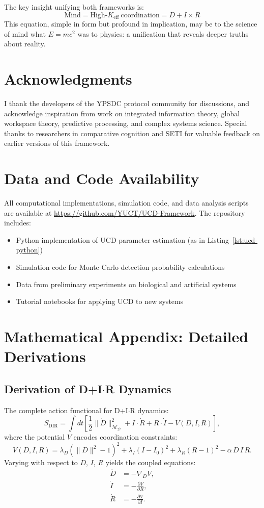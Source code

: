 \documentclass[12pt,a4paper]{article}
\newcommand{\eff}{\mathrm{eff}}
\newcommand{\Dict}{\mathcal{D}}
\newcommand{\Mdict}{\mathcal{M}_{\Dict}}
\newcommand{\Ke}{K_{\eff}}
\begin{document}
	The key insight unifying both frameworks is:
	\[
	\boxed{\text{Mind} = \text{High-}\Ke\ \text{coordination} = D + I \times R}
	\]
	This equation, simple in form but profound in implication, may be to the science of mind what \(E = mc^2\) was to physics: a unification that reveals deeper truths about reality.
	
	\section*{Acknowledgments}
	
	I thank the developers of the YPSDC protocol community for discussions, and acknowledge inspiration from work on integrated information theory, global workspace theory, predictive processing, and complex systems science. Special thanks to researchers in comparative cognition and SETI for valuable feedback on earlier versions of this framework.
	
	\section*{Data and Code Availability}
	
	All computational implementations, simulation code, and data analysis scripts are available at \url{https://github.com/YUCT/UCD-Framework}. The repository includes:
	\begin{itemize}
		\item Python implementation of UCD parameter estimation (as in Listing~\ref{lst:ucd-python})
		\item Simulation code for Monte Carlo detection probability calculations
		\item Data from preliminary experiments on biological and artificial systems
		\item Tutorial notebooks for applying UCD to new systems
	\end{itemize}
	
	\appendix
	
	\section{Mathematical Appendix: Detailed Derivations}
	
	\subsection{Derivation of D+I\(\cdot\)R Dynamics}
	
	The complete action functional for D+I\(\cdot\)R dynamics:
	\[
	S_{\mathrm{DIR}} = \int dt \left[ \frac{1}{2}\|\dot{D}\|^2_{\Mdict} + I \cdot \dot{R} + R \cdot \dot{I} - V(D,I,R) \right],
	\]
	where the potential \(V\) encodes coordination constraints:
	\[
	V(D,I,R) = \lambda_D (\|D\|^2 - 1)^2 + \lambda_I (I - I_0)^2 + \lambda_R (R - 1)^2 - \alpha\, D\,I\,R.
	\]
	Varying with respect to \(D\), \(I\), \(R\) yields the coupled equations:
	\begin{align*}
		\ddot{D} &= -\nabla_D V, \\
		\dot{I}  &= -\frac{\partial V}{\partial R}, \\
		\dot{R}  &= -\frac{\partial V}{\partial I}.
	\end{align*}
	
\end{document}
